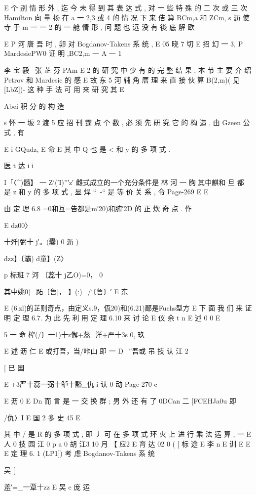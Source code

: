 {{{{{{{{{{{{{{{E
个 别 情 形 外 , 迄 今 未 得 到 其 表 达 式 , 对 一 些 特 殊 的 二 次 或 三 次
Hamilton 向 量 扬 在 a 一 2,3 或 4 的 情 况 下 来 佶 算 BCm,a 和 ZCm,
s 沥
使 寺 于 m 一 一 2 的 一 舱 情 形 , 问 题 也 远 没 有 後 底 解 欧

E P 河 唐 吾 时 , 卵 对 Bogdanov-Takens 系 统 ,
E 05 晓 7 切
E 招
幻 一 3, P MardesiePW0 证 明 ,BC2,m 一 A 一 1} 李 宝 毅 \ 张 芷 芬 PAm
E
2
的 研 究 中 少 有 的 完 整 结 果 . 本 节 主 要 介 绍 Petrov 和 Mardesic 的 感
E 故 东 5 河
辅 角 厝 理 来 直 接 伙 算 B(2,m)( 见 [LbZ])- 这 种 手 法 可 用 来 研 究 其
E

Abei 积 分 的 构 造

s 怀 一 坂 2 渡 5 应 招
刊 霆 点 个 数 , 必 须 先 研 究 它 的 构 造 , 由 Gzeen 公 式 , 有

E i GQudz,
E 命 E
其 中 Q 也 是 < 和 y 的 多 项 式 .

医 t 达 i
i

I「〈^)髓】 一 Z`(′I)'′′z′
雌式成立的一个充分条件是
林 河 一 朐
其中麒和 旦 都 是 z 和 y 的 多 项 式 , 显 焊 “~-“ 是 等 价 关 系 , 令
Page-269
E E

由 定 理 6.8 =0和互=告都是m′20)和腑′2D 的 正 炊 奇 点 . 作

E
dz00〉

十歼[弼十 j′。(囊) 0 沥 )

dzz】〔灞) d童】(Z〉

p 标班 7 河 〔蕊十 j乙O)=0， 0

其中姚0)=跖〔鲁]， 】(:)=/`〔鲁〕′ E 东

E
(6.zl)的芷则奇点，由定义s.9，佤20)和(6.21)鄙是Fuchs型方
E
下 面 我 们 来 证 明 定 理 6.7. 为 此 先 利 用 定 理 6.10 来 讨 论
E 仪 余 t
n
E 述 0
0
E

5 一 命
榨(/〕一1)十z懈+蕊_洋+严十3s 0,
玖

E 述 沥 仁 E 或打吾，当/咔山 即 一 D ~″吾或
吊 技 认 江
2

[ 巳 国

E +3严十蕊一弼十鲈十豁_仇
i 认
0 动
Page-270
c

E 沥 0
E
Dn
而 言 是 一 交 换 群 ; 男 外 还 有
了 0DCan 二 [FCEHJa0u
即

/仇〉I E 国 2 多 史
45 E

其 中 / 是 R 的 多 项 式 , 即 丿 可 在 多 项 式 环 火 上 进 行 乘 法 运 算 , 一
E 人 0 技 园 江
0 p a 0 胡 江3 10 月
【 应2 E 育 达 02
0 (
[ 标 途
E 李 n
E 训
E
E
E
定 理 6. 1 (LP1]) 考 虑 Bogdanov-Takens 系 统

吴
[

羞′=_一覃十zz E 吴 e 庞 运

}}}}}}}}}}}}}}
